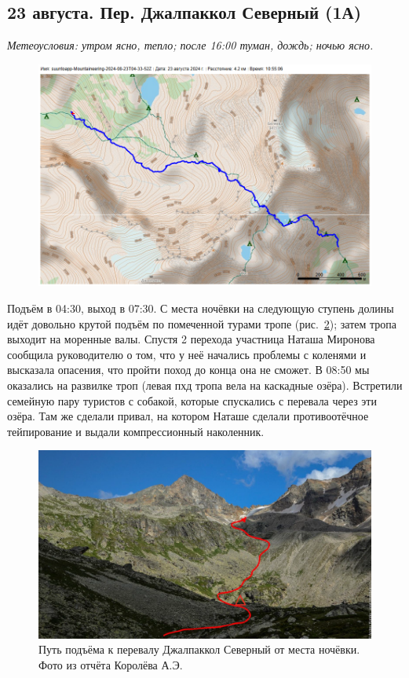 \subsection{23 августа.  Пер. Джалпаккол Северный (1А)}
\textit{Метеоусловия: утром ясно, тепло; после 16:00 туман, дождь; ночью ясно.}

\begin{figure}[h!]
	\centering
	\includegraphics[angle=0, width=0.7\linewidth]{../pics/mini_maps/23}
	\label{fig:mini_23}
\end{figure}


Подъём в 04:30, выход в 07:30. С места ночёвки на следующую ступень долины идёт довольно крутой подъём по помеченной турами тропе (рис.~\ref{fig:23augstart}); затем тропа выходит на моренные валы. Спустя 2 перехода участница Наташа Миронова сообщила руководителю о том, что у неё начались проблемы с коленями и высказала опасения, что пройти поход до конца она не сможет. В 08:50 мы оказались на развилке троп (левая пхд тропа вела на каскадные озёра). Встретили семейную пару туристов с собакой, которые спускались с перевала через эти озёра. Там же сделали привал, на котором Наташе сделали противоотёчное тейпирование и выдали компрессионный наколенник.

\begin{figure}[h!]
	\centering
	\includegraphics[angle=0, width=0.7\linewidth]{../pics/23augstart}
	\caption{Путь подъёма к перевалу Джалпаккол Северный от места ночёвки. Фото из отчёта Королёва А.Э. \cite{Korolyov2018}}
	\label{fig:23augstart}
\end{figure}

